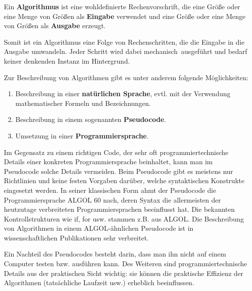 \begin{defn}
Ein \textbf{Algorithmus} ist eine wohldeﬁnierte Rechenvorschrift, die eine
Größe oder eine Menge von Größen als \textbf{Eingabe} verwendet und eine Größe oder eine Menge von Größen als \textbf{Ausgabe} erzeugt.

Somit ist ein Algorithmus eine Folge von Rechenschritten, die die Eingabe in die Ausgabe umwandeln. Jeder Schritt wird dabei \glqq mechanisch\grqq\ ausgeführt und bedarf keiner denkenden Instanz im Hintergrund.
\end{defn}

\begin{bem} 
Zur Beschreibung von Algorithmen
gibt es unter anderem folgende Möglichkeiten: 
\begin{enumerate}
	\item Beschreibung in einer \textbf{natürlichen Sprache}, evtl. mit der Verwendung mathematischer Formeln und Bezeichnungen. 
	\item Beschreibung in einem sogenannten \textbf{Pseudocode}. 
	\item Umsetzung in einer \textbf{Programmiersprache}. 
\end{enumerate} 
Im Gegensatz zu einem richtigen Code, der sehr oft programmiertechnische Details einer konkreten Programmiersprache beinhaltet, kann man im Pseudocode solche Details vermeiden. Beim Pseudocode gibt es meistens nur Richtlinien und keine festen Vorgaben darüber, welche syntaktischen Konstrukte eingesetzt werden. In seiner klassischen Form ahmt der Pseudocode die Programmiersprache ALGOL 60 nach, deren Syntax die allermeisten der heutzutage verbreiteten Programmiersprachen beeinflusst hat. Die bekannten Kontrollstrukturen wie if, for usw.  stammen z.B. aus ALGOL. Die Beschreibung von Algorithmen in einem ALGOL-ähnlichen Pseudocode ist in wissenschaftlichen Publikationen sehr verbreitet. 

Ein Nachteil des Pseudocodes besteht darin, dass man ihn nicht auf einem Computer testen bzw. ausführen kann. Des Weiteren sind programmiertechnische Details aus der praktischen Sicht wichtig: sie können  die praktische Effizienz der Algorithmen (tatsächliche Laufzeit usw.) erheblich beeinflussen. 
\end{bem} 

